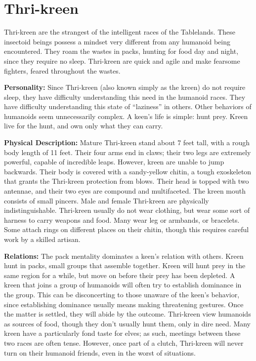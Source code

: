 \section{Thri-kreen}

Thri-kreen are the strangest of the intelligent races of the Tablelands. These insectoid beings possess a mindset very different from any humanoid being encountered. They roam the wastes in packs, hunting for food day and night, since they require no sleep. Thri-kreen are quick and agile and make fearsome fighters, feared throughout the wastes.

\textbf{Personality:} Since Thri-kreen (also known simply as the kreen) do not require sleep, they have difficulty understanding this need in the humanoid races. They have difficulty understanding this state of ``laziness'' in others. Other behaviors of humanoids seem unnecessarily complex. A keen's life is simple: hunt prey. Kreen live for the hunt, and own only what they can carry.

\textbf{Physical Description:} Mature Thri-kreen stand about 7 feet tall, with a rough body length of 11 feet. Their four arms end in claws; their two legs are extremely powerful, capable of incredible leaps. However, kreen are unable to jump backwards. Their body is covered with a sandy-yellow chitin, a tough exoskeleton that grants the Thri-kreen protection from blows. Their head is topped with two antennae, and their two eyes are compound and multifaceted. The kreen mouth consists of small pincers. Male and female Thri-kreen are physically indistinguishable. Thri-kreen usually do not wear clothing, but wear some sort of harness to carry weapons and food. Many wear leg or armbands, or bracelets. Some attach rings on different places on their chitin, though this requires careful work by a skilled artisan.

\textbf{Relations:} The pack mentality dominates a keen's relation with others. Kreen hunt in packs, small groups that assemble together. Kreen will hunt prey in the same region for a while, but move on before their prey has been depleted. A kreen that joins a group of humanoids will often try to establish dominance in the group. This can be disconcerting to those unaware of the keen's behavior, since establishing dominance usually means making threatening gestures. Once the matter is settled, they will abide by the outcome. Thri-kreen view humanoids as sources of food, though they don't usually hunt them, only in dire need. Many kreen have a particularly fond taste for elves; as such, meetings between these two races are often tense. However, once part of a clutch, Thri-kreen will never turn on their humanoid friends, even in the worst of situations.

